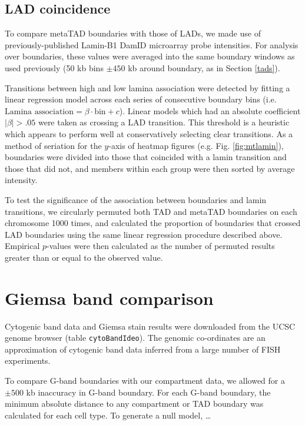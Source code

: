 \documentclass[a4paper,11pt,oneside]{book}
\begin{document}
\subsection{LAD coincidence}\label{meth:metalad}

To compare metaTAD boundaries with those of LADs, we made use of previously-published Lamin-B1 DamID microarray probe intensities.\citet{Peric-Hupkes2010} For analysis over boundaries, these values were averaged into the same boundary windows as used previously (50 kb bins $\pm450$ kb around boundary, as in Section \ref{tads}). 

Transitions between high and low lamina association were detected by fitting a linear regression model across each series of consecutive boundary bins (i.e. $\textrm{Lamina association}=\beta\cdot\textrm{bin} + c$). Linear models which had an absolute coefficient $|\beta| >.05$ were taken as crossing a LAD transition. This threshold is a heuristic which appears to perform well at conservatively selecting clear transitions. As a method of seriation for the $y$-axis of heatmap figures (e.g. Fig. \ref{fig:mtlamin}), boundaries were divided into those that coincided with a lamin transition and those that did not, and members within each group were then sorted by average intensity. 

To test the significance of the association between boundaries and lamin transitions, we circularly permuted both TAD and metaTAD boundaries on each chromosome 1000 times, and calculated the proportion of boundaries that crossed LAD boundaries using the same linear regression procedure described above. Empirical $p$-values were then calculated as the number of permuted results greater than or equal to the observed value.

\section{Giemsa band comparison}\label{giemsa-band-comparison}

Cytogenic band data and Giemsa stain results were downloaded from the
UCSC genome browser (table \texttt{cytoBandIdeo}). The genomic
co-ordinates are an approximation of cytogenic band data inferred from a
large number of FISH experiments.\citep{Furey2003}

To compare G-band boundaries with our compartment data, we allowed for a
$\pm 500$ kb inaccuracy in G-band boundary. For each G-band boundary,
the minimum absolute distance to any compartment or TAD boundary was
calculated for each cell type. To generate a null model, \ldots
\end{document}
